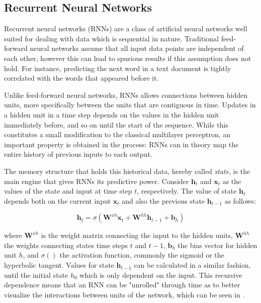 \documentclass{kththesis}
\begin{document}
\subsection{Recurrent Neural Networks}

Recurrent neural networks (RNNs) are a class of artificial neural networks well suited for dealing with data which is sequential in nature. Traditional feed-forward neural networks assume that all input data points are independent of each other, however this can lead to spurious results if this assumption does not hold. For instance, predicting the next word in a text document is tightly correlated with the words that appeared before it. 

Unlike feed-forward neural networks, RNNs allows connections between hidden units, more specifically between the units that are contiguous in time. Updates in a hidden unit in a time step depends on the values in the hidden unit immediately before, and so on until the start of the sequence. While this constitutes a small modification to the classical multilayer perceptron, an important property is obtained in the process: RNNs can in theory map the entire history of previous inputs to each output. 

The memory structure that holds this historical data, hereby called \emph{state}, is the main engine that gives RNNs its predictive power. Consider $\mathbf{h}_t$ and $\mathbf{x}_t$ as the values of the state and input at time step $t$, respectively. The value of state $\mathbf{h}_t$ depends both on the current input $\mathbf{x}_t$ and also the previous state $\mathbf{h}_{t-1}$ as follows:

\begin{equation}
\mathbf{h}_t = \sigma(\mathbf{W}^{xh}\mathbf{x}_t + \mathbf{W}^{hh}\mathbf{h}_{t-1} + \mathbf{b}_h)
\end{equation}

where $\mathbf{W}^{xh}$ is the weight matrix connecting the input to the hidden units, $\mathbf{W}^{hh}$ the weights connecting states time steps $t$ and $t-1$, $\mathbf{b}_h$ the bias vector for hidden unit $h$, and $\sigma()$ the activation function, commonly the sigmoid or the hyperbolic tangent. Values for state $\mathbf{h}_{t-1}$ can be calculated in a similar fashion, until the initial state $h_0$ which is only dependent on the input. This recursive dependence means that an RNN can be "unrolled" through time as to better visualize the interactions between units of the network, which can be seen in .
\end{document}
